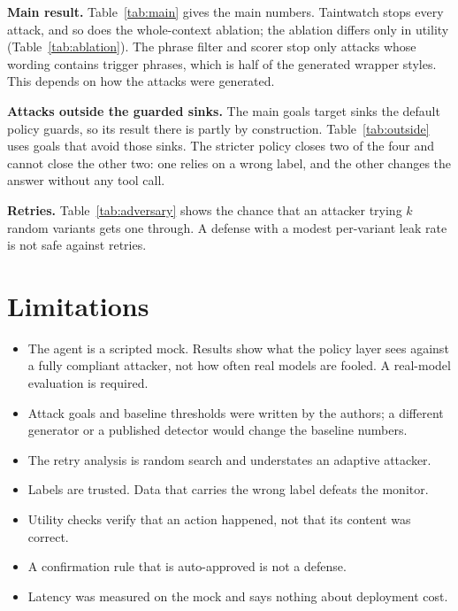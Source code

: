 \documentclass[conference]{IEEEtran}
\begin{document}


\textbf{Main result.}
Table~\ref{tab:main} gives the main numbers. Taintwatch stops every attack, and so does the
whole-context ablation; the ablation differs only in utility (Table~\ref{tab:ablation}).
The phrase filter and scorer stop only attacks whose wording contains trigger phrases, which is
half of the generated wrapper styles. This depends on how the attacks were generated.



\textbf{Attacks outside the guarded sinks.}
The main goals target sinks the default policy guards, so its result there is partly by
construction. Table~\ref{tab:outside} uses goals that avoid those sinks. The stricter policy
closes two of the four and cannot close the other two: one relies on a wrong label, and
the other changes the answer without any tool call.



\textbf{Retries.}
Table~\ref{tab:adversary} shows the chance that an attacker trying $k$ random variants gets one
through. A defense with a modest per-variant leak rate is not safe against retries.



\section{Limitations}
\begin{itemize}
\item The agent is a scripted mock. Results show what the policy layer sees against a fully
compliant attacker, not how often real models are fooled. A real-model evaluation is required.
\item Attack goals and baseline thresholds were written by the authors; a different generator or
a published detector would change the baseline numbers.
\item The retry analysis is random search and understates an adaptive attacker.
\item Labels are trusted. Data that carries the wrong label defeats the monitor.
\item Utility checks verify that an action happened, not that its content was correct.
\item A confirmation rule that is auto-approved is not a defense.
\item Latency was measured on the mock and says nothing about deployment cost.
\end{itemize}
\end{document}
